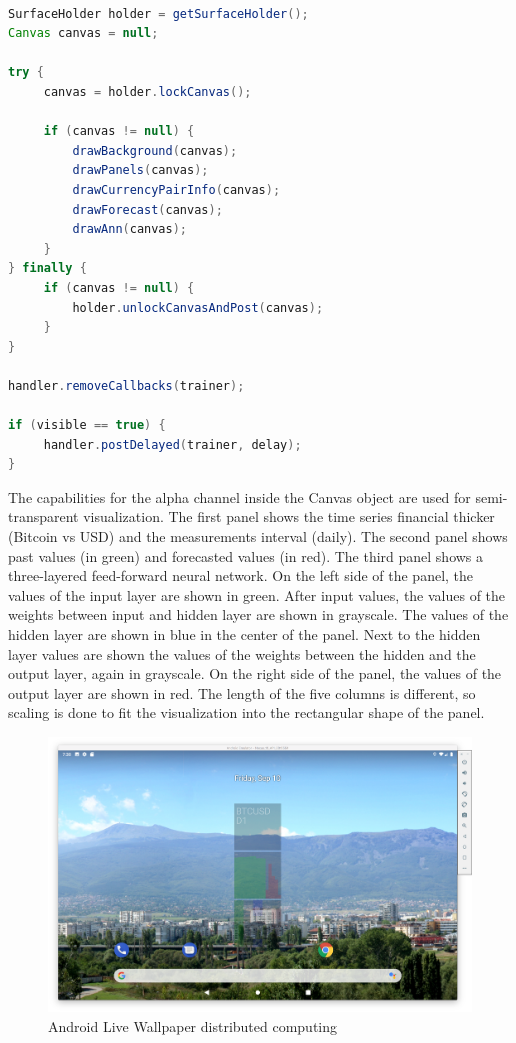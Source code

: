 \documentclass[a4paper,conference]{IEEEtran}
\begin{document}
\begin{lstlisting}[caption=Intermediate results visualization, language=Java, basicstyle=\tiny, label=lst06]

SurfaceHolder holder = getSurfaceHolder();
Canvas canvas = null;

try {
	 canvas = holder.lockCanvas();

	 if (canvas != null) {
	 	 drawBackground(canvas);
	 	 drawPanels(canvas);
	 	 drawCurrencyPairInfo(canvas);
	 	 drawForecast(canvas);
	 	 drawAnn(canvas);
	 }
} finally {
	 if (canvas != null) {
	 	 holder.unlockCanvasAndPost(canvas);
	 }
}

handler.removeCallbacks(trainer);

if (visible == true) {
	 handler.postDelayed(trainer, delay);
}

\end{lstlisting}

The capabilities for the alpha channel inside the Canvas object are used for semi-transparent visualization. The first panel shows the time series financial thicker (Bitcoin vs USD) and the measurements interval (daily). The second panel shows past values (in green) and forecasted values (in red). The third panel shows a three-layered feed-forward neural network. On the left side of the panel, the values of the input layer are shown in green. After input values, the values of the weights between input and hidden layer are shown in grayscale. The values of the hidden layer are shown in blue in the center of the panel. Next to the hidden layer values are shown the values of the weights between the hidden and the output layer, again in grayscale. On the right side of the panel, the values of the output layer are shown in red. The length of the five columns is different, so scaling is done to fit the visualization into the rectangular shape of the panel. 

\begin{figure}[htbp]
\centerline{\includegraphics[width=1.0\linewidth]{fig01.png}}
\caption{Android Live Wallpaper distributed computing}
\label{fig01}
\end{figure}
\end{document}
